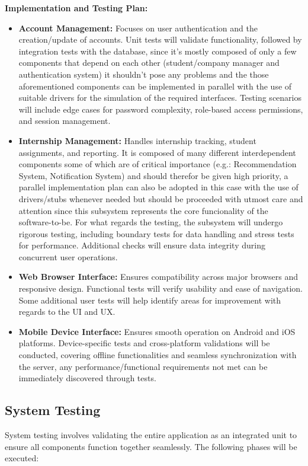 \documentclass[11pt,twoside]{article}
\begin{document}
\textbf{Implementation and Testing Plan:}
\begin{itemize}
    \item \textbf{Account Management:} Focuses on user authentication and the creation/update of accounts. Unit tests will validate functionality, followed by integration tests with the database, since it's mostly composed of only a few components that depend on each other (student/company manager and authentication system) it shouldn't pose any problems and the those aforementioned components can be implemented in parallel with the use of suitable drivers for the simulation of the required interfaces. Testing scenarios will include edge cases for password complexity, role-based access permissions, and session management.
    \item \textbf{Internship Management:} Handles internship tracking, student assignments, and reporting. It is composed of many different interdependent components some of which are of critical importance (e.g.: Recommendation System, Notification System) and should therefor be given high priority, a parallel implementation plan can also be adopted in this case with the use of drivers/stubs whenever needed but should be proceeded with utmost care and attention since this subsystem represents the core funcionality of the software-to-be. For what regards the testing, the subsystem will undergo rigorous testing, including boundary tests for data handling and stress tests for performance. Additional checks will ensure data integrity during concurrent user operations.
    \item \textbf{Web Browser Interface:} Ensures compatibility across major browsers and responsive design. Functional tests will verify usability and ease of navigation. Some additional user tests will help identify areas for improvement with regards to the UI and UX.
    \item \textbf{Mobile Device Interface:} Ensures smooth operation on Android and iOS platforms. Device-specific tests and cross-platform validations will be conducted, covering offline functionalities and seamless synchronization with the server, any performance/functional requirements not met can be immediately discovered through tests.
\end{itemize}


\subsection{System Testing}
System testing involves validating the entire application as an integrated unit to ensure all components function together seamlessly. The following phases will be executed:
\end{document}
